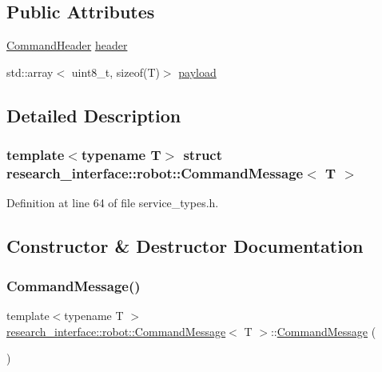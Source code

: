 \subsection*{Public Attributes}
\begin{DoxyCompactItemize}
\item 
\hyperlink{structresearch__interface_1_1robot_1_1CommandHeader}{Command\+Header} \hyperlink{structresearch__interface_1_1robot_1_1CommandMessage_a62fe6afacf849021d3b1c5b44ef3f364}{header}
\item 
std\+::array$<$ uint8\+\_\+t, sizeof(T)$>$ \hyperlink{structresearch__interface_1_1robot_1_1CommandMessage_a0af29b5860ddcb6ea5724a2116f38a7a}{payload}
\end{DoxyCompactItemize}


\subsection{Detailed Description}
\subsubsection*{template$<$typename T$>$\newline
struct research\+\_\+interface\+::robot\+::\+Command\+Message$<$ T $>$}



Definition at line 64 of file service\+\_\+types.\+h.



\subsection{Constructor \& Destructor Documentation}
\mbox{\label{structresearch__interface_1_1robot_1_1CommandMessage_aba81088f0b27b77f2a566d16f580000b}} 
\subsubsection{\texorpdfstring{Command\+Message()}{CommandMessage()}\hspace{0.1cm}{\footnotesize\ttfamily [1/2]}}
{\footnotesize\ttfamily template$<$typename T $>$ \\
\hyperlink{structresearch__interface_1_1robot_1_1CommandMessage}{research\+\_\+interface\+::robot\+::\+Command\+Message}$<$ T $>$\+::\hyperlink{structresearch__interface_1_1robot_1_1CommandMessage}{Command\+Message} (\begin{DoxyParamCaption}{ }\end{DoxyParamCaption})\hspace{0.3cm}{\ttfamily [default]}}

